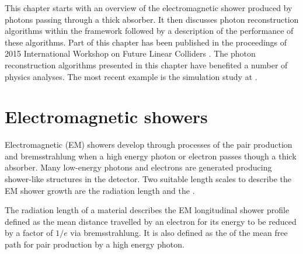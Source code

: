 This chapter starts with an overview of the electromagnetic shower produced by photons passing through a thick absorber. It then discusses photon reconstruction algorithms within the \pandora framework followed by a description of the performance of these algorithms.  Part of this chapter has been published in the proceedings of 2015 International Workshop on Future Linear Colliders \cite{Xu:2016rcz}. The photon reconstruction algorithms presented in this chapter have benefited a number of physics analyses. The most recent example  is the  \HepProcess{\PHiggs \to \Pgamma \Pgamma} simulation study at  \CLIC \cite{Kacarevic:higgsToGammaGamma}.





\section{Electromagnetic showers}
\label{sec:photonEMshower}
Electromagnetic (EM) showers develop through processes of the pair production and bremsstrahlung when a high energy photon or electron passes though a thick absorber. Many low-energy photons and electrons are generated producing shower-like  structures in the detector. Two suitable length scales to describe the EM shower growth are the radiation length and the \RM \cite{PhysRev.149.201,Bathow:1970dn}.

The radiation length of a material describes the EM longitudinal  shower profile defined as the mean distance travelled by an electron for  its energy to be reduced by a factor of $1/e$ via bremsstrahlung. It is also defined as the  of the mean free path  for pair production by a high energy photon\cite{segre1977nuclei}.


